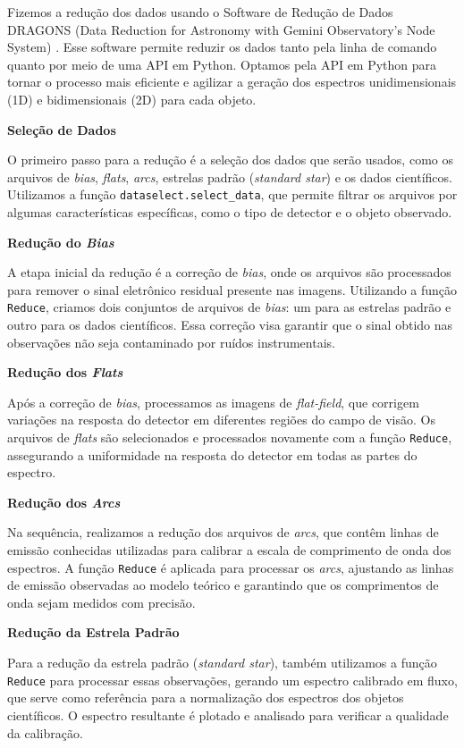 Fizemos a redução dos dados usando o Software de Redução de Dados DRAGONS (Data Reduction for Astronomy with Gemini Observatory's Node System) \cite{dragons_python}. Esse software permite reduzir os dados tanto pela linha de comando quanto por meio de uma API em Python. Optamos pela API em Python para tornar o processo mais eficiente e agilizar a geração dos espectros unidimensionais (1D) e bidimensionais (2D) para cada objeto.

\textbf{Seleção de Dados}

O primeiro passo para a redução é a seleção dos dados que serão usados, como os arquivos de \textit{bias}, \textit{flats}, \textit{arcs}, estrelas padrão (\textit{standard star}) e os dados científicos. Utilizamos a função \verb|dataselect.select_data|, que permite filtrar os arquivos por algumas características específicas, como o tipo de detector e o objeto observado.

\textbf{Redução do \textit{Bias}}

A etapa inicial da redução é a correção de \textit{bias}, onde os arquivos são processados para remover o sinal eletrônico residual presente nas imagens. Utilizando a função \verb|Reduce|, criamos dois conjuntos de arquivos de \textit{bias}: um para as estrelas padrão e outro para os dados científicos. Essa correção visa garantir que o sinal obtido nas observações não seja contaminado por ruídos instrumentais.

\textbf{Redução dos \textit{Flats}}

Após a correção de \textit{bias}, processamos as imagens de \textit{flat-field}, que corrigem variações na resposta do detector em diferentes regiões do campo de visão. Os arquivos de \textit{flats} são selecionados e processados novamente com a função \verb|Reduce|, assegurando a uniformidade na resposta do detector em todas as partes do espectro.

\textbf{Redução dos \textit{Arcs}}

Na sequência, realizamos a redução dos arquivos de \textit{arcs}, que contêm linhas de emissão conhecidas utilizadas para calibrar a escala de comprimento de onda dos espectros. A função \verb|Reduce| é aplicada para processar os \textit{arcs}, ajustando as linhas de emissão observadas ao modelo teórico e garantindo que os comprimentos de onda sejam medidos com precisão.

\textbf{Redução da Estrela Padrão}

Para a redução da estrela padrão (\textit{standard star}), também utilizamos a função \verb|Reduce| para processar essas observações, gerando um espectro calibrado em fluxo, que serve como referência para a normalização dos espectros dos objetos científicos. O espectro resultante é plotado e analisado para verificar a qualidade da calibração.

